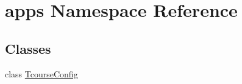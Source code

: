 \hypertarget{namespaceapps}{}\section{apps Namespace Reference}
\label{namespaceapps}
\subsection*{Classes}
\begin{DoxyCompactItemize}
\item 
class \hyperlink{classapps_1_1_tcourse_config}{Tcourse\+Config}
\end{DoxyCompactItemize}
